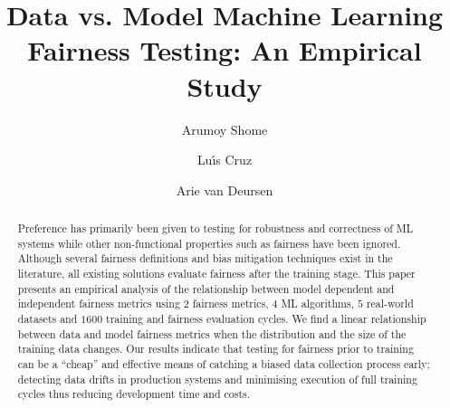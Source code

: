 \documentclass[sigconf,review,anonymous]{acmart}
\begin{document}
\title{Data vs. Model Machine Learning Fairness Testing: An Empirical Study}


\author{Arumoy Shome}

\author{Lu{\'\i}s Cruz}

\author{Arie van Deursen}

\renewcommand{\shortauthors}{Trovato et al.}

\begin{abstract}

  Preference has primarily been given to testing for robustness and
  correctness of ML systems while other non-functional properties such
  as fairness have been ignored. Although several fairness definitions
  and bias mitigation techniques exist in the literature, all existing
  solutions evaluate fairness after the training stage. This paper
  presents an empirical analysis of the relationship between model
  dependent and independent fairness metrics using $2$ fairness
  metrics, $4$ ML algorithms, $5$ real-world datasets and $1600$
  training and fairness evaluation cycles. We find a linear
  relationship between data and model fairness metrics when the
  distribution and the size of the training data changes. Our results
  indicate that testing for fairness prior to training can be a
  ``cheap'' and effective means of catching a biased data collection
  process early; detecting data drifts in production systems and
  minimising execution of full training cycles thus reducing
  development time and costs.


\end{abstract}

\maketitle
\end{document}
